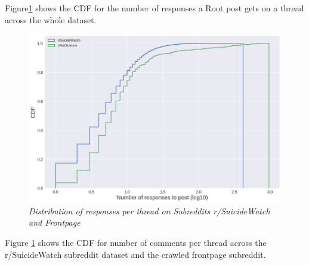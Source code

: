Figure\ref{fig:responseDist} shows the CDF for the number of responses a Root post gets on a thread across the whole dataset. 
\begin{figure}[!h]
    \centering
    \includegraphics[width=0.4\linewidth]{Figures/responseDistSW}
    \caption{\textsl{ Distribution of responses per thread on Subreddits r/SuicideWatch and Frontpage }}
    \label{fig:responseDist}
\end{figure}
Figure \ref{fig:responseDist} shows the CDF for number of comments per thread across the r/SuicideWatch subreddit dataset and the crawled frontpage subreddit. 
